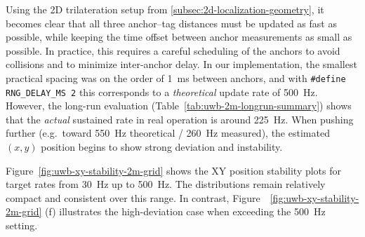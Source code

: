 \documentclass[a4paper,11pt]{article}
\begin{document}
Using the 2D trilateration setup from \ref{subsec:2d-localization-geometry}, it becomes clear that
all three anchor--tag distances must be updated as fast as possible, while keeping the
time offset between anchor measurements as small as possible. In practice, this requires
a careful scheduling of the anchors to avoid collisions and to minimize inter-anchor delay.
In our implementation, the smallest practical spacing was on the order of \SI{1}{ms} between anchors,
and with \texttt{#define RNG_DELAY_MS 2} this corresponds to a \emph{theoretical} update rate of
\SI{500}{Hz}. However, the long-run evaluation (Table~\ref{tab:uwb-2m-longrun-summary}) shows that the
\emph{actual} sustained rate in real operation is around \SI{225}{Hz}. When pushing further (e.g.\ toward
\SI{550}{Hz} theoretical / \SI{260}{Hz} measured), the estimated $(x,y)$ position begins to show strong
deviation and instability.

Figure~\ref{fig:uwb-xy-stability-2m-grid} shows the XY position stability plots for target rates
from \SI{30}{Hz} up to \SI{500}{Hz}. The distributions remain relatively compact and consistent over this range.
In contrast, Figure~~\ref{fig:uwb-xy-stability-2m-grid} (f) illustrates the high-deviation case when exceeding the
\SI{500}{Hz} setting.
\end{document}
